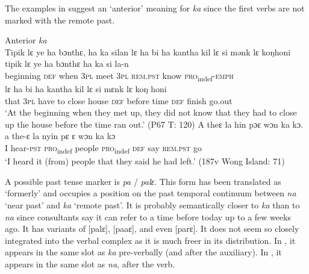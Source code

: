 The examples in  suggest an ‘anterior' meaning for \textit{ka} since the first verbs are not marked with the remote past.

\ea%
    \label{ex:125}
    Anterior \textit{ka}\\
    \ea  Tipik lɛ ye ha bɔnthɛ, ha ka silan lɛ ha  bi ha kantha kil lɛ si mənk lɛ koŋhoni\\
    \gll tipik      lɛ    ye    ha    bɔnthɛ  ha    ka        si      la-n\\
    beginning  \textsc{def}  when  \textsc{3pl}  meet    \textsc{3pl}  \textsc{rem.pst}    know    \textsc{pro}\textsubscript{indef}\textsc{{}-emph}\\
    \gll lɛ    ha    bi    ha    kantha  kil      lɛ    si      mɛnk    lɛ    koŋ    honi\\
    that  \textsc{3pl}  have  to    close    house    \textsc{def}  before  time    \textsc{def}  finish    go.out\\
    \glt ‘At the beginning when they met up, they did not know that they had to close up the house before the time ran out.' (P67 T: 120)
\ex  A theɛ la hin pɔɛ wɔn ka kɔ.\\
    \gll a  the-ɛ      la      nyin    pɛ      ɛ    wɔn  ka        kɔ\\
    I  hear-\textsc{pst}    \textsc{pro}\textsubscript{indef}  people  \textsc{pro}\textsubscript{indef}  \textsc{def}  say  \textsc{rem.pst}    go\\
    \glt ‘I heard it (from) people that they said he had left.' (187v Wong Island: 71)
\z
\z

A possible past tense marker is \textit{pa} / \textit{palɛ}. This form has been translated as ‘formerly' and occupies a position on the past temporal continuum between \textit{na} ‘near past' and \textit{ka} ‘remote past'. It is probably semantically closer to \textit{ka} than to \textit{na} since consultants say it can refer to a time before today up to a few weeks ago. It has variants of [palɛ], [paaɛ], and even [parɛ]. It does not seem so closely integrated into the verbal complex as it is much freer in its distribution. In , it appears in the same slot as \textit{ka} pre-verbally (and after the auxiliary). In , it appears in the same slot as \textit{na}, after the verb.

